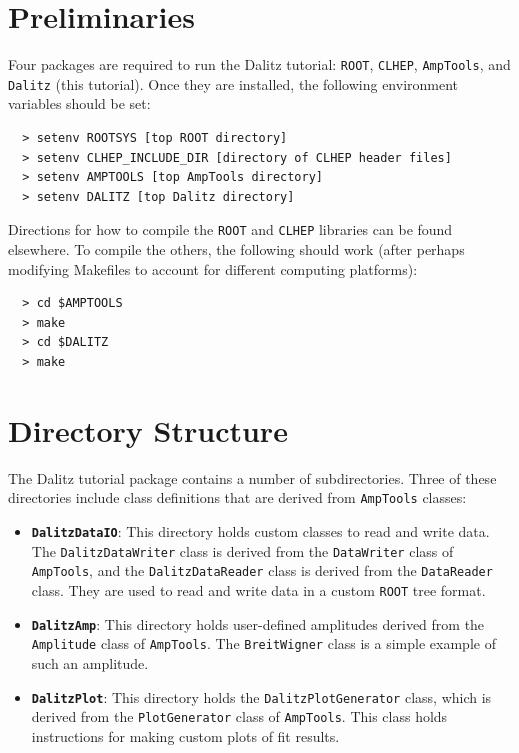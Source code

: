 \documentclass[11pt]{article}
\begin{document}
\section{Preliminaries}

Four packages are required to run the Dalitz tutorial: {\tt ROOT}, {\tt CLHEP}, {\tt AmpTools}, and {\tt Dalitz} (this tutorial).  Once they are installed, the following environment variables should be set:
\begin{verbatim}
  > setenv ROOTSYS [top ROOT directory]
  > setenv CLHEP_INCLUDE_DIR [directory of CLHEP header files]
  > setenv AMPTOOLS [top AmpTools directory]
  > setenv DALITZ [top Dalitz directory]
\end{verbatim}

Directions for how to compile the {\tt ROOT} and {\tt CLHEP} libraries can be found elsewhere.  To compile the others, the following should work (after perhaps modifying Makefiles to account for different computing platforms):
\begin{verbatim}
  > cd $AMPTOOLS
  > make
  > cd $DALITZ
  > make
\end{verbatim}


\section{Directory Structure}

The Dalitz tutorial package contains a number of subdirectories.  Three of these directories include class definitions that are derived from {\tt AmpTools} classes:
\begin{itemize}
\item {\tt \bf DalitzDataIO}:  This directory holds custom classes to read and write data.  The {\tt DalitzDataWriter} class is derived from the {\tt DataWriter} class of {\tt AmpTools}, and the {\tt DalitzDataReader} class is derived from the {\tt DataReader} class.  They are used to read and write data in a custom {\tt ROOT} tree format.
\item {\tt \bf DalitzAmp}: This directory holds user-defined amplitudes derived from the {\tt Amplitude} class of {\tt AmpTools}.  The {\tt BreitWigner} class is a simple example of such an amplitude.
\item {\tt \bf DalitzPlot}:  This directory holds the {\tt DalitzPlotGenerator} class, which is derived from the {\tt PlotGenerator} class of {\tt AmpTools}.  This class holds instructions for making custom plots of fit results.
\end{itemize}
\end{document}

